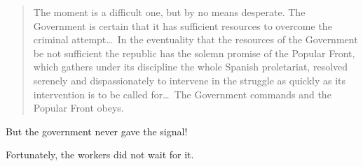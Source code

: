 \begin{quotation}
  The moment is a difficult one, but by no means desperate. The Government is certain that it has sufficient resources to overcome the criminal attempt\ldots\ In the eventuality that the resources of the Government be not sufficient the republic has the solemn promise of the Popular Front, which gathers under its discipline the whole Spanish proletariat, resolved serenely and dispassionately to intervene in the struggle as quickly as its intervention is to be called for\ldots\ The Government commands and the Popular Front obeys.
\end{quotation}

But the government never gave the signal!

\medskip

Fortunately, the workers did not wait for it.